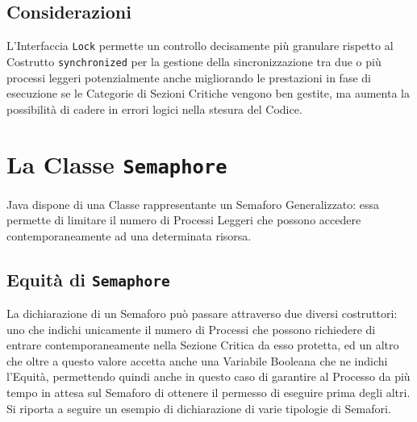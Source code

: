 \subsection{Considerazioni}
L'Interfaccia \texttt{Lock} permette un controllo decisamente più granulare rispetto al Costrutto \texttt{synchronized} per la gestione della sincronizzazione tra due o più processi leggeri potenzialmente anche migliorando le prestazioni in fase di esecuzione se le Categorie di Sezioni Critiche vengono ben gestite, ma aumenta la possibilità di cadere in errori logici nella stesura del Codice.

\section{La Classe \texttt{Semaphore}}
Java dispone di una Classe rappresentante un Semaforo Generalizzato\cite{Semaphore_JavaDocs}: essa permette di limitare il numero di Processi Leggeri che possono accedere contemporaneamente ad una determinata risorsa.
\subsection{Equità di \texttt{Semaphore}}
La dichiarazione di un Semaforo può passare attraverso due diversi costruttori: uno che indichi unicamente il numero di Processi che possono richiedere di entrare contemporaneamente nella Sezione Critica da esso protetta, ed un altro che oltre a questo valore accetta anche una Variabile Booleana che ne indichi l'Equità, permettendo quindi anche in questo caso di garantire al Processo da più tempo in attesa sul Semaforo di ottenere il permesso di eseguire prima degli altri. Si riporta a seguire un esempio di dichiarazione di varie tipologie di Semafori.

